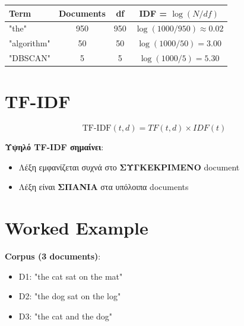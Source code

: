 \begin{examplebox}[IDF Values (N=1000)]
\begin{center}
\begin{tabular}{lccc}
\toprule
Term & Documents & df & IDF = $\log(N/df)$ \\
\midrule
"the" & 950 & 950 & $\log(1000/950) \approx 0.02$ \\
"algorithm" & 50 & 50 & $\log(1000/50) = 3.00$ \\
"DBSCAN" & 5 & 5 & $\log(1000/5) = 5.30$ \\
\bottomrule
\end{tabular}
\end{center}
\end{examplebox}

\section{TF-IDF}

\begin{formulabox}
\begin{equation}
\text{TF-IDF}(t, d) = TF(t, d) \times IDF(t)
\end{equation}

\textbf{Υψηλό TF-IDF σημαίνει}:
\begin{itemize}
    \item Λέξη εμφανίζεται συχνά στο \textbf{ΣΥΓΚΕΚΡΙΜΕΝΟ} document
    \item Λέξη είναι \textbf{ΣΠΑΝΙΑ} στα υπόλοιπα documents
\end{itemize}
\end{formulabox}

\section{Worked Example}

\begin{examplebox}
\textbf{Corpus (3 documents)}:
\begin{itemize}
    \item D1: "the cat sat on the mat"
    \item D2: "the dog sat on the log"
    \item D3: "the cat and the dog"
\end{itemize}
\end{examplebox}

